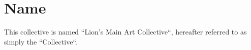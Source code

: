 \chapter{Name}\label{sec:name}
This collective is named ``Lion's Main Art Collective``, hereafter referred to as simply the ``Collective``.
